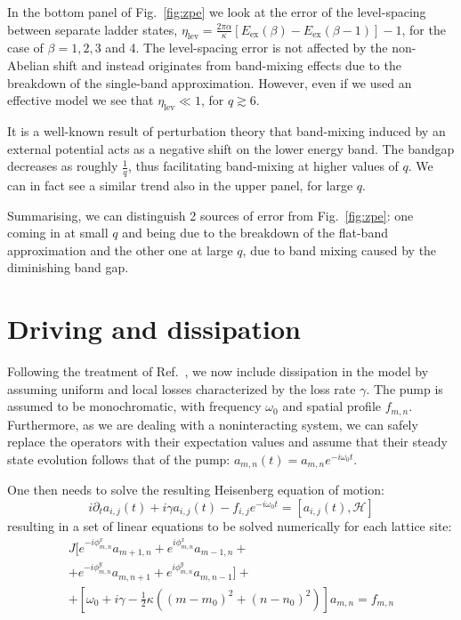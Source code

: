 \documentclass[twocolumn, 10pt, aps, superscriptaddress, floatfix, showpacs, pra, citeautoscript]{revtex4-1}
\begin{document}
In the bottom panel of Fig.~\ref{fig:zpe} we look at the error of the
level-spacing between separate ladder states,
$\eta_{\text{lev}} = \frac{2\pi \alpha}{\kappa} [E_{\text{ex}}(\beta)
- E_{\text{ex}}(\beta - 1)] -1$,
for the case of $\beta = 1, 2, 3$ and 4.  The level-spacing error is not
affected by the non-Abelian shift and instead originates from
band-mixing effects due to the breakdown of the single-band
approximation. However, even if we used an effective model we see that
$\eta_{\text{lev}} \ll 1$, for $q \gtrsim 6$.

It is a well-known result of perturbation theory that band-mixing
induced by an external potential acts as a negative shift on the lower
energy band.  The bandgap decreases as roughly $\frac{1}{q}$, thus
facilitating band-mixing at higher values of $q$. We can in fact see a
similar trend also in the upper panel, for large $q$.

Summarising, we can distinguish 2 sources of error from
Fig.~\ref{fig:zpe}: one coming in at small $q$ and being due to the
breakdown of the flat-band approximation and the other one at large
$q$, due to band mixing caused by the diminishing band gap.




\section{Driving and dissipation}\label{sec:driven-dissipation}

Following the treatment of Ref.~, we now
include dissipation in the model by assuming uniform and local losses
characterized by the loss rate $\gamma$. The pump is assumed to be
monochromatic, with frequency $\omega_0$ and spatial profile
$f_{m,n}$.  Furthermore, as we are dealing with a noninteracting
system, we can safely replace the operators with their expectation
values and assume that their steady state evolution follows that of
the pump: $a_{m,n}(t) = a_{m,n} e^{-i \omega_0 t}$.

One then needs to solve the resulting Heisenberg equation of motion:
%
\begin{equation}
i\partial_{t}a_{i,j}(t)+i\gamma
a_{i,j}(t)-f_{i,j}e^{-i\omega_{0}t}=\left[a_{i,j}(t),\mathcal{H}\right]
\end{equation}
resulting in a set of linear equations to be solved numerically for each
lattice site:
%
\begin{multline}\label{eq:linear_problem}
J[e^{-i\phi_{m,n}^x}a_{m+1,n}+e^{i\phi_{m,n}^x}a_{m-1,n}+\\
+e^{-i\phi_{m,n}^y}a_{m,n+1}+e^{i\phi_{m,n}^y}a_{m,n-1}]+\\
+\left[\omega_{0}+i\gamma-\frac{1}{2}\kappa
\left((m-m_0)^{2}+(n-n_0)^{2}\right)\right]a_{m,n}=f_{m,n}
\end{multline}
\end{document}
